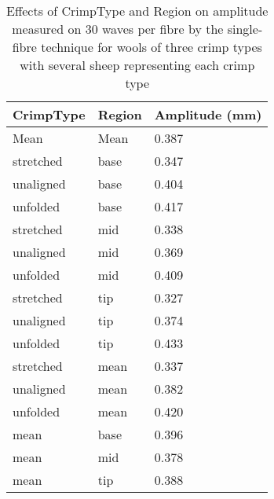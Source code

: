 %

\begin{table}[htp]
\centering
\caption{Effects of CrimpType and Region on amplitude  measured on 30 waves per fibre by the single-fibre technique for wools of three crimp types with several sheep representing each crimp type}
\label{tab:sfamplint}
\vspace{0.1in}
\begin{tabular}{|p{1.0in}|p{1.0in}|p{0.9in}|} \hline
     CrimpType  & Region & Amplitude (mm) \\  \hline
 Mean &  Mean       & 0.387  \\ \hline
  stretched     & base & 0.347          \\
  unaligned     & base & 0.404          \\
  unfolded     &  base & 0.417          \\ \hline
  stretched     & mid & 0.338     \\
  unaligned     & mid & 0.369     \\
  unfolded     &  mid & 0.409     \\ \hline
  stretched     & tip & 0.327        \\
  unaligned     & tip & 0.374        \\
  unfolded      & tip & 0.433        \\ \hline
  stretched     & mean & 0.337 \\
  unaligned     & mean & 0.382 \\
  unfolded      & mean & 0.420 \\ \hline
  mean          & base & 0.396 \\
  mean          & mid &  0.378 \\
  mean          & tip &  0.388 \\ \hline
\end{tabular}
\end{table}

%
